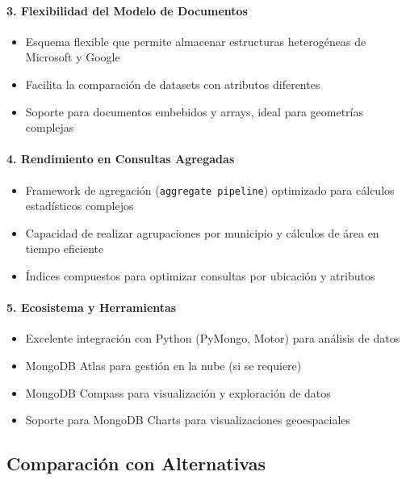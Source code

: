 \documentclass[12pt,a4paper]{article}
\begin{document}
\paragraph{3. Flexibilidad del Modelo de Documentos}
\begin{itemize}[leftmargin=*]
    \item Esquema flexible que permite almacenar estructuras heterogéneas de Microsoft y Google
    \item Facilita la comparación de datasets con atributos diferentes
    \item Soporte para documentos embebidos y arrays, ideal para geometrías complejas
\end{itemize}

\paragraph{4. Rendimiento en Consultas Agregadas}
\begin{itemize}[leftmargin=*]
    \item Framework de agregación (\texttt{aggregate pipeline}) optimizado para cálculos estadísticos complejos
    \item Capacidad de realizar agrupaciones por municipio y cálculos de área en tiempo eficiente
    \item Índices compuestos para optimizar consultas por ubicación y atributos
\end{itemize}

\paragraph{5. Ecosistema y Herramientas}
\begin{itemize}[leftmargin=*]
    \item Excelente integración con Python (PyMongo, Motor) para análisis de datos
    \item MongoDB Atlas para gestión en la nube (si se requiere)
    \item MongoDB Compass para visualización y exploración de datos
    \item Soporte para MongoDB Charts para visualizaciones geoespaciales
\end{itemize}

\subsection{Comparación con Alternativas}
\end{document}
